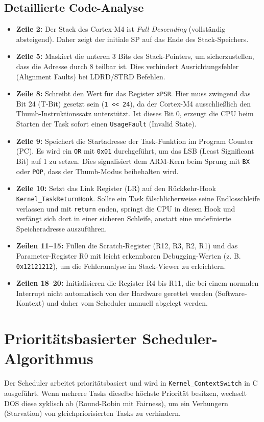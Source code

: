 \subsection{Detaillierte Code-Analyse}
\begin{itemize}
    \item \textbf{Zeile 2:} Der Stack des Cortex-M4 ist \textit{Full Descending} (vollständig absteigend). Daher zeigt der initiale SP auf das Ende des Stack-Speichers.
    \item \textbf{Zeile 5:} Maskiert die unteren 3 Bits des Stack-Pointers, um sicherzustellen, dass die Adresse durch 8 teilbar ist. Dies verhindert Ausrichtungsfehler (Alignment Faults) bei LDRD/STRD Befehlen.
    \item \textbf{Zeile 8:} Schreibt den Wert für das Register \lstinline|xPSR|. Hier muss zwingend das Bit 24 (T-Bit) gesetzt sein (\lstinline|1 << 24|), da der Cortex-M4 ausschließlich den Thumb-Instruktionssatz unterstützt. Ist dieses Bit 0, erzeugt die CPU beim Starten der Task sofort einen \lstinline|UsageFault| (Invalid State).
    \item \textbf{Zeile 9:} Speichert die Startadresse der Task-Funktion im Program Counter (PC). Es wird ein \lstinline|OR| mit \lstinline|0x01| durchgeführt, um das LSB (Least Significant Bit) auf 1 zu setzen. Dies signalisiert dem ARM-Kern beim Sprung mit \lstinline|BX| oder \lstinline|POP|, dass der Thumb-Modus beibehalten wird.
    \item \textbf{Zeile 10:} Setzt das Link Register (LR) auf den Rückkehr-Hook \lstinline|Kernel_TaskReturnHook|. Sollte ein Task fälschlicherweise seine Endlosschleife verlassen und mit \lstinline|return| enden, springt die CPU in diesen Hook und verfängt sich dort in einer sicheren Schleife, anstatt eine undefinierte Speicheradresse auszuführen.
    \item \textbf{Zeilen 11--15:} Füllen die Scratch-Register (R12, R3, R2, R1) und das Parameter-Register R0 mit leicht erkennbaren Debugging-Werten (z. B. \lstinline|0x12121212|), um die Fehleranalyse im Stack-Viewer zu erleichtern.
    \item \textbf{Zeilen 18--20:} Initialisieren die Register R4 bis R11, die bei einem normalen Interrupt nicht automatisch von der Hardware gerettet werden (Software-Kontext) und daher vom Scheduler manuell abgelegt werden.
\end{itemize}

\section{Prioritätsbasierter Scheduler-Algorithmus}
Der Scheduler arbeitet prioritätsbasiert und wird in \lstinline|Kernel_ContextSwitch| in C ausgeführt. Wenn mehrere Tasks dieselbe höchste Priorität besitzen, wechselt DOS diese zyklisch ab (Round-Robin mit Fairness), um ein Verhungern (Starvation) von gleichpriorisierten Tasks zu verhindern.

